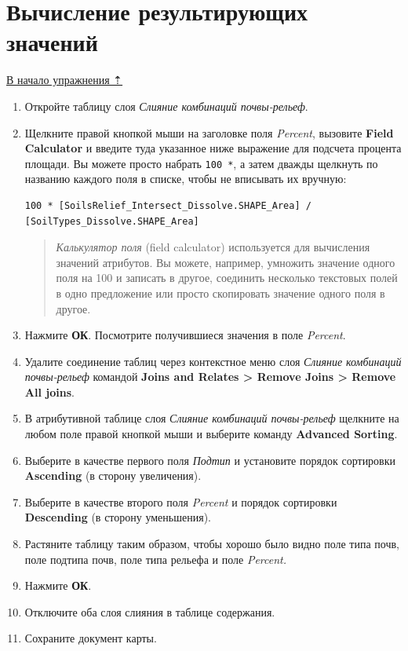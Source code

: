 \documentclass[12pt,]{book}
\begin{document}
\hypertarget{overlay-resulting}{%
\section{Вычисление результирующих значений}\label{overlay-resulting}}

\protect\hyperlink{overlay}{В начало упражнения ⇡}

\begin{enumerate}
\def\labelenumi{\arabic{enumi}.}
\item
  Откройте таблицу слоя \emph{Слияние комбинаций почвы-рельеф}.
\item
  Щелкните правой кнопкой мыши на заголовке поля \emph{Percent}, вызовите \textbf{Field Calculator} и введите туда указанное ниже выражение для подсчета процента площади. Вы можете просто набрать \texttt{100\ *}, а затем дважды щелкнуть по названию каждого поля в списке, чтобы не вписывать их вручную:

\begin{verbatim}
100 * [SoilsRelief_Intersect_Dissolve.SHAPE_Area] /
[SoilTypes_Dissolve.SHAPE_Area]
\end{verbatim}

  \begin{quote}
  \emph{Калькулятор поля} (field calculator) используется для вычисления значений атрибутов. Вы можете, например, умножить значение одного поля на 100 и записать в другое, соединить несколько текстовых полей в одно предложение или просто скопировать значение одного поля в другое.
  \end{quote}
\item
  Нажмите \textbf{ОК}. Посмотрите получившиеся значения в поле \emph{Percent}.
\item
  Удалите соединение таблиц через контекстное меню слоя \emph{Слияние комбинаций почвы-рельеф} командой \textbf{Joins and Relates \textgreater{} Remove Joins \textgreater{} Remove All joins}.
\item
  В атрибутивной таблице слоя \emph{Слияние комбинаций почвы-рельеф} щелкните на любом поле правой кнопкой мыши и выберите команду \textbf{Advanced Sorting}.
\item
  Выберите в качестве первого поля \emph{Подтип} и установите порядок сортировки \textbf{Ascending} (в сторону увеличения).
\item
  Выберите в качестве второго поля \emph{Percent} и порядок сортировки \textbf{Descending} (в сторону уменьшения).
\item
  Растяните таблицу таким образом, чтобы хорошо было видно поле типа почв, поле подтипа почв, поле типа рельефа и поле \emph{Percent.}
\item
  Нажмите \textbf{ОК}.
\item
  Отключите оба слоя слияния в таблице содержания.
\item
  Сохраните документ карты.


\end{enumerate}
\end{document}
